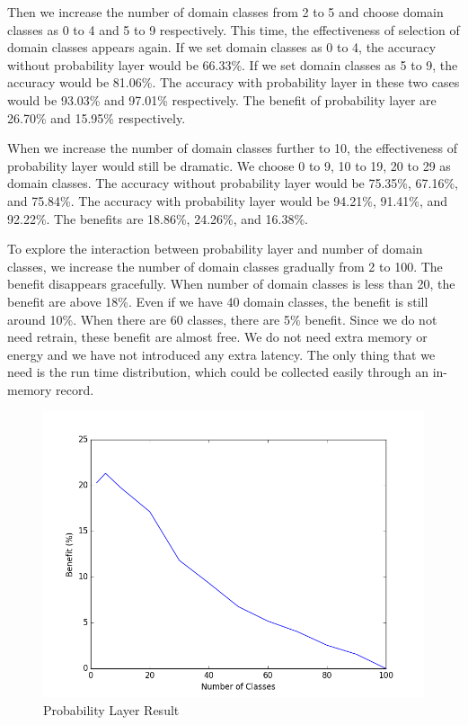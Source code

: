 \documentclass{article}
\begin{document}
Then we increase the number of domain classes from 2 to 5 and choose domain classes as 0 to 4 and 5 to 9 respectively. This time, the effectiveness of selection of domain classes appears again. If we set domain classes as 0 to 4, the accuracy without probability layer would be 66.33\%. If we set domain classes as 5 to 9, the accuracy would be 81.06\%. The accuracy with probability layer in these two cases would be 93.03\% and 97.01\% respectively. The benefit of probability layer are 26.70\% and 15.95\% respectively.

When we increase the number of domain classes further to 10, the effectiveness of probability layer would still be dramatic. We choose 0 to 9, 10 to 19, 20 to 29 as domain classes. The accuracy without probability layer would be 75.35\%, 67.16\%, and 75.84\%. The accuracy with probability layer would be 94.21\%, 91.41\%, and 92.22\%. The benefits are 18.86\%, 24.26\%, and 16.38\%.

To explore the interaction between probability layer and number of domain classes, we increase the number of domain classes gradually from 2 to 100. The benefit disappears gracefully. When number of domain classes is less than 20, the benefit are above 18\%. Even if we have 40 domain classes, the benefit is still around 10\%. When there are 60 classes, there are 5\% benefit. Since we do not need retrain, these benefit are almost free. We do not need extra memory or energy and we have not introduced any extra latency. The only thing that we need is the run time distribution, which could be collected easily through an in-memory record.


\begin{figure}
\includegraphics[scale=0.43]{figure_1.png}
\caption{Probability Layer Result}
\label{fig:ProbabilityLayer}
\end{figure}
\end{document}
